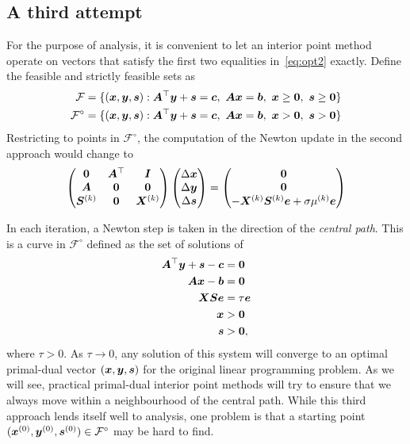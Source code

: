 \subsection{A third attempt}
For the purpose of analysis, it is convenient to let an interior point method operate on vectors that satisfy the first two equalities in~\eqref{eq:opt2} exactly. Define the feasible and strictly feasible sets as
\begin{align*}
 \mathcal{F} &= \{(\vct{x},\vct{y},\vct{s}) \mid \mtx{A}^{\trans}\vct{y}+\vct{s}=\vct{c}, \ \mtx{A}\vct{x}=\vct{b}, \ \vct{x}\geq \zerovct, \ \vct{s}\geq \zerovct\}\\
 \mathcal{F}^{\circ} &= \{(\vct{x},\vct{y},\vct{s}) \mid \mtx{A}^{\trans}\vct{y}+\vct{s}=\vct{c}, \ \mtx{A}\vct{x}=\vct{b}, \ \vct{x}> \zerovct, \ \vct{s}> \zerovct\}\\
\end{align*}
Restricting to points in $\mathcal{F}^{\circ}$, the computation of the Newton update in the second approach would change to
\begin{equation*}
 \begin{pmatrix}
  \bm{0} & \bm{A}^{\top} & \bm{I} \\
  \bm{A} & \bm{0} & \bm{0} \\
  \bm{S}^{(k)} & \bm{0} & \bm{X}^{(k)}
 \end{pmatrix}
\begin{pmatrix} \Delta\bm{x}\\ \Delta \bm{y}\\ \Delta\bm{s} \end{pmatrix} = \begin{pmatrix} \bm{0} \\ \bm{0} \\ -\bm{X}^{(k)}\bm{S}^{(k)}\bm{e}+\sigma \mu^{(k)}\bm{e}\end{pmatrix}
\end{equation*}

In each iteration, a Newton step is taken in the direction of the {\em central path}. This is a curve in $\mathcal{F}^{\circ}$ defined as the set of solutions of
\begin{align}\label{eq:cpopt}
 \begin{split}
  \bm{A}^{\top}\bm{y}+\bm{s}-\bm{c} &= \bm{0}\\
  \bm{A}\bm{x}-\bm{b} & = \bm{0}\\
  \bm{X}\bm{S}\bm{e} &= \tau \bm{e}\\
  \bm{x}&> \bm{0}\\
  \bm{s}&> \bm{0},
 \end{split}
\end{align}
where $\tau>0$. As $\tau\to 0$, any solution of this system will converge to an optimal primal-dual vector $(\bm{x},\bm{y},\bm{s})$ for the original linear programming problem. As we will see, practical primal-dual interior point methods will try to ensure that we always move within a neighbourhood of the central path. While this third approach lends itself well to analysis, one problem is that a starting point $(\bm{x}^{(0)},\bm{y}^{(0)},\bm{s}^{(0)})\in \mathcal{F}^{\circ}$ may be hard to find.



